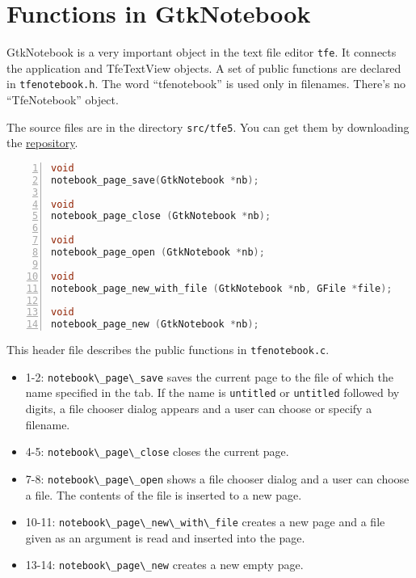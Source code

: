 \section{Functions in GtkNotebook}\label{functions-in-gtknotebook}

GtkNotebook is a very important object in the text file editor
\passthrough{\lstinline!tfe!}. It connects the application and
TfeTextView objects. A set of public functions are declared in
\passthrough{\lstinline!tfenotebook.h!}. The word ``tfenotebook'' is
used only in filenames. There's no ``TfeNotebook'' object.

The source files are in the directory
\passthrough{\lstinline!src/tfe5!}. You can get them by downloading the
\href{https://github.com/ToshioCP/Gtk4-tutorial}{repository}.

\begin{lstlisting}[language=C, numbers=left]
void
notebook_page_save(GtkNotebook *nb);

void
notebook_page_close (GtkNotebook *nb);

void
notebook_page_open (GtkNotebook *nb);

void
notebook_page_new_with_file (GtkNotebook *nb, GFile *file);

void
notebook_page_new (GtkNotebook *nb);
\end{lstlisting}

This header file describes the public functions in
\passthrough{\lstinline!tfenotebook.c!}.

\begin{itemize}
\tightlist
\item
  1-2: \passthrough{\lstinline!notebook\_page\_save!} saves the current
  page to the file of which the name specified in the tab. If the name
  is \passthrough{\lstinline!untitled!} or
  \passthrough{\lstinline!untitled!} followed by digits, a file chooser
  dialog appears and a user can choose or specify a filename.
\item
  4-5: \passthrough{\lstinline!notebook\_page\_close!} closes the
  current page.
\item
  7-8: \passthrough{\lstinline!notebook\_page\_open!} shows a file
  chooser dialog and a user can choose a file. The contents of the file
  is inserted to a new page.
\item
  10-11: \passthrough{\lstinline!notebook\_page\_new\_with\_file!}
  creates a new page and a file given as an argument is read and
  inserted into the page.
\item
  13-14: \passthrough{\lstinline!notebook\_page\_new!} creates a new
  empty page.
\end{itemize}


